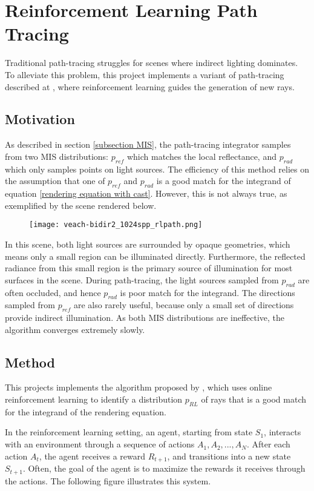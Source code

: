 \chapter{Reinforcement Learning Path Tracing}
\label{chapter RL}
Traditional path-tracing struggles for scenes where indirect lighting dominates. To alleviate this problem, this project implements a variant of path-tracing described at \cite{RLPT}, where reinforcement learning guides the generation of new rays.

\section{Motivation}
As described in section \ref{subsection MIS}, the path-tracing integrator samples from two MIS distributions: $p_{ref}$ which matches the local reflectance, and $p_{rad}$ which only samples points on light sources. The efficiency of this method relies on the assumption that one of $p_{ref}$ and $p_{rad}$ is a good match for the integrand of equation \ref{rendering equation with cast}. However, this is not always true, as exemplified by the scene rendered below.

\begin{figure}[H]
    \centering
    \texttt{[image: veach-bidir2\_1024spp\_rlpath.png]}
\end{figure}

In this scene, both light sources are surrounded by opaque geometries, which means only a small region can be illuminated directly. Furthermore, the reflected radiance from this small region is the primary source of illumination for most surfaces in the scene. During path-tracing, the light sources sampled from $p_{rad}$ are often occluded, and hence $p_{rad}$ is poor match for the integrand. The directions sampled from $p_{ref}$ are also rarely useful, because only a small set of directions provide indirect illumination. As both MIS distributions are ineffective, the algorithm converges extremely slowly.

\section{Method}
This projects implements the algorithm proposed by \cite{RLPT}, which uses online reinforcement learning to identify a distribution $p_{RL}$ of rays that is a good match for the integrand of the rendering equation.

In the reinforcement learning setting, an agent, starting from state $S_1$, interacts with an environment through a sequence of actions $A_1,A_2,...,A_N$. After each action $A_t$, the agent receives a reward $R_{t+1}$, and transitions into a new state $S_{t+1}$. Often, the goal of the agent is to maximize the rewards it receives through the actions. The following figure illustrates this system.

